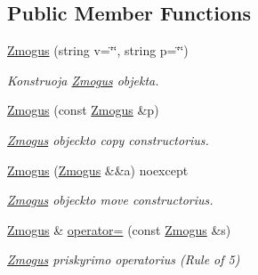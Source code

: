 \subsection*{Public Member Functions}
\begin{DoxyCompactItemize}
\item 
\mbox{\label{class_zmogus_ab37b701d317bcedf500a10467b277cf8}} 
\mbox{\hyperlink{class_zmogus_ab37b701d317bcedf500a10467b277cf8}{Zmogus}} (string v=\char`\"{}\char`\"{}, string p=\char`\"{}\char`\"{})
\begin{DoxyCompactList}\small\item\em Konstruoja \mbox{\hyperlink{class_zmogus}{Zmogus}} objekta. \end{DoxyCompactList}\item 
\mbox{\label{class_zmogus_a372eea87912af869f1fe0bd976613c66}} 
\mbox{\hyperlink{class_zmogus_a372eea87912af869f1fe0bd976613c66}{Zmogus}} (const \mbox{\hyperlink{class_zmogus}{Zmogus}} \&p)
\begin{DoxyCompactList}\small\item\em \mbox{\hyperlink{class_zmogus}{Zmogus}} objeckto copy constructor\textquotesingle{}ius. \end{DoxyCompactList}\item 
\mbox{\label{class_zmogus_a08957cc3460003bf69edecf40051a9cb}} 
\mbox{\hyperlink{class_zmogus_a08957cc3460003bf69edecf40051a9cb}{Zmogus}} (\mbox{\hyperlink{class_zmogus}{Zmogus}} \&\&a) noexcept
\begin{DoxyCompactList}\small\item\em \mbox{\hyperlink{class_zmogus}{Zmogus}} objeckto move constructor\textquotesingle{}ius. \end{DoxyCompactList}\item 
\mbox{\label{class_zmogus_a733a4e060192fa34e04875cc68d1df15}} 
\mbox{\hyperlink{class_zmogus}{Zmogus}} \& \mbox{\hyperlink{class_zmogus_a733a4e060192fa34e04875cc68d1df15}{operator=}} (const \mbox{\hyperlink{class_zmogus}{Zmogus}} \&s)
\begin{DoxyCompactList}\small\item\em \mbox{\hyperlink{class_zmogus}{Zmogus}} priskyrimo operatorius (Rule of 5) \end{DoxyCompactList}\item 
\mbox{\label{class_zmogus_ac61c2abedd1403a2a3d5db3984363162}} 

\end{DoxyCompactItemize}

